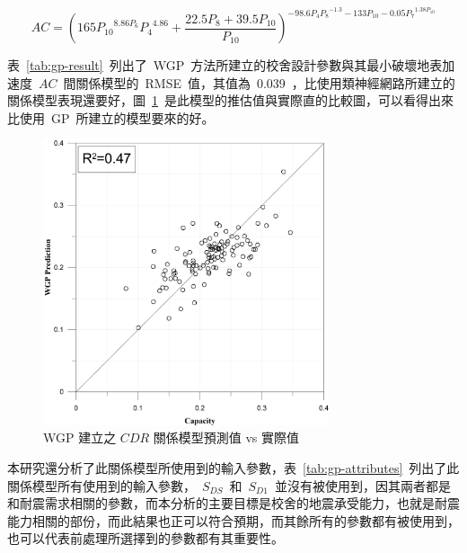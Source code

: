 \begin{equation} AC = {({165 P_{10}}^{8.86 P_6} {P_4}^{4.86} + \dfrac{22.5 P_8 + 39.5 P_{10}}{P_{10}} )}^{-98.6 P_4{P_8}^{-1.3} - 133 P_{10} - 0.05 {P_7}^{1.38 P_{10}} }  \label{eq:WGP_AC}\end{equation}

表~\ref{tab:gp-result}~列出了~WGP~方法所建立的校舍設計參數與其最小破壞地表加速度~$AC$~間關係模型的~RMSE~值，其值為~0.039~，比使用類神經網路所建立的關係模型表現還要好，圖~\ref{fig:WGP}~是此模型的推估值與實際直的比較圖，可以看得出來比使用~GP~所建立的模型要來的好。

\begin{figure}[hbtp]
  \begin{center}
    \includegraphics[width=0.75\textwidth]{figures/wgp.pdf}
    \caption{WGP 建立之 $CDR$ 關係模型預測值 vs 實際值} 
    \label{fig:WGP}
  \end{center}
\end{figure}


本研究還分析了此關係模型所使用到的輸入參數，表~\ref{tab:gp-attributes}~列出了此關係模型所有使用到的輸入參數，~$S_{DS}$~和~$S_{D1}$~並沒有被使用到，因其兩者都是和耐震需求相關的參數，而本分析的主要目標是校舍的地震承受能力，也就是耐震能力相關的部份，而此結果也正可以符合預期，而其餘所有的參數都有被使用到，也可以代表前處理所選擇到的參數都有其重要性。

